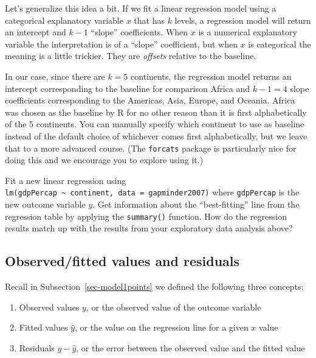 \documentclass[
  letterpaper,
  DIV=11,
  numbers=noendperiod]{scrreprt}
\theoremstyle{definition}
\theoremstyle{remark}
\begin{document}
Let's generalize this idea a bit. If we fit a linear regression model
using a categorical explanatory variable \(x\) that has \(k\) levels, a
regression model will return an intercept and \(k - 1\) ``slope''
coefficients. When \(x\) is a numerical explanatory variable the
interpretation is of a ``slope'' coefficient, but when \(x\) is
categorical the meaning is a little trickier. They are \emph{offsets}
relative to the baseline.

In our case, since there are \(k = 5\) continents, the regression model
returns an intercept corresponding to the baseline for comparison Africa
and \(k - 1 = 4\) slope coefficients corresponding to the Americas,
Asia, Europe, and Oceania. Africa was chosen as the baseline by R for no
other reason than it is first alphabetically of the 5 continents. You
can manually specify which continent to use as baseline instead of the
default choice of whichever comes first alphabetically, but we leave
that to a more advanced course. (The \texttt{forcats} package is
particularly nice for doing this and we encourage you to explore using
it.)

\begin{tcolorbox}[enhanced jigsaw, coltitle=black, toprule=.15mm, bottomtitle=1mm, breakable, leftrule=.75mm, title={{🎯} Learning Check 5.4}, opacitybacktitle=0.6, colback=white, rightrule=.15mm, opacityback=0, toptitle=1mm, colbacktitle=quarto-callout-tip-color!10!white, colframe=quarto-callout-tip-color-frame, titlerule=0mm, arc=.35mm, bottomrule=.15mm, left=2mm]
Fit a new linear regression using
\texttt{lm(gdpPercap\ \textasciitilde{}\ continent,\ data\ =\ gapminder2007)}
where \texttt{gdpPercap} is the new outcome variable \(y\). Get
information about the ``best-fitting'' line from the regression table by
applying the \texttt{summary()} function. How do the regression results
match up with the results from your exploratory data analysis above?
\end{tcolorbox}

\hypertarget{sec-model2points}{%
\subsection{Observed/fitted values and
residuals}\label{sec-model2points}}

Recall in Subsection~\ref{sec-model1points} we defined the following
three concepts:

\begin{enumerate}
\def\labelenumi{\arabic{enumi}.}
\item
  Observed values \(y\), or the observed value of the outcome variable
\item
  Fitted values \(\widehat{y}\), or the value on the regression line for
  a given \(x\) value
\item
  Residuals \(y - \widehat{y}\), or the error between the observed value
  and the fitted value
\end{enumerate}
\end{document}
